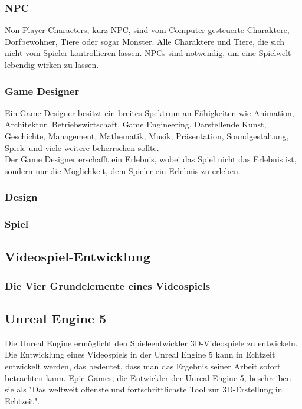 \documentclass[12pt,a4paper,bibliography=totocnumbered,listof=totocnumbered]{scrartcl}
\begin{document}
\subsubsection{NPC}
Non-Player Characters, kurz NPC, sind vom Computer gesteuerte Charaktere, Dorfbewohner, Tiere oder sogar Monster. Alle Charaktere und Tiere, die sich nicht vom Spieler kontrollieren lassen. NPCs sind notwendig, um eine Spielwelt lebendig wirken zu lassen.
\subsubsection{Game Designer}
Ein Game Designer besitzt ein breites Spektrum an Fähigkeiten wie Animation, Architektur, Betriebswirtschaft, Game Engineering, Darstellende Kunst, Geschichte, Management, Mathematik, Musik, Präsentation, Soundgestaltung, Spiele und viele weitere beherrschen sollte.
\\
Der Game Designer erschafft ein Erlebnis, wobei das Spiel nicht das Erlebnis ist, sondern nur die Möglichkeit, dem Spieler ein Erlebnis zu erleben.
\subsubsection{Design}%
\subsubsection{Spiel}%
\subsection{Videospiel-Entwicklung}
\subsubsection{Die Vier Grundelemente eines Videospiels}%
\subsection{Unreal Engine 5}
Die Unreal Engine ermöglicht den Spieleentwickler 3D-Videospiele zu entwickeln. Die Entwicklung eines Videospiels in der Unreal Engine 5 kann in Echtzeit entwickelt werden, das bedeutet, dass man das Ergebnis seiner Arbeit sofort betrachten kann. Epic Games, die Entwickler der Unreal Engine 5, beschreiben sie als "Das weltweit offenste und fortschrittlichste Tool zur 3D-Erstellung in Echtzeit".
\end{document}
